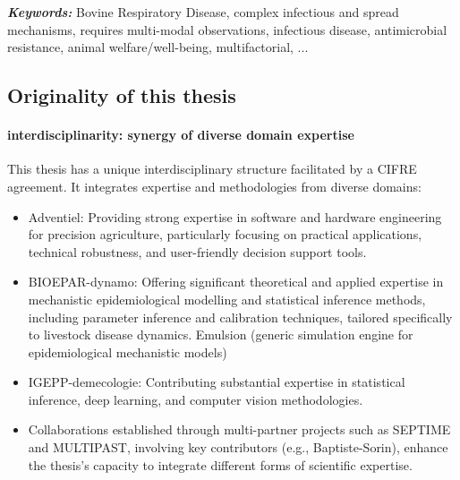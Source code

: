 \textit{\textbf{Keywords:}} Bovine Respiratory Disease, complex infectious and spread mechanisms, requires multi-modal observations, infectious disease, antimicrobial resistance, animal welfare/well-being, multifactorial, ...


\subsection{Originality of this thesis}


\paragraph{interdisciplinarity: synergy of diverse domain expertise }

This thesis has a unique interdisciplinary structure facilitated by a CIFRE agreement. It integrates expertise and methodologies from diverse domains:

\begin{itemize}
    \item Adventiel: Providing strong expertise in software and hardware engineering for precision agriculture, particularly focusing on practical applications, technical robustness, and user-friendly decision support tools.
    \item BIOEPAR-dynamo: Offering significant theoretical and applied expertise in mechanistic epidemiological modelling and statistical inference methods, including parameter inference and calibration techniques, tailored specifically to livestock disease dynamics. Emulsion (generic simulation engine for epidemiological mechanistic models)
    \item IGEPP-demecologie: Contributing substantial expertise in statistical inference, deep learning, and computer vision methodologies.
    \item Collaborations established through multi-partner projects such as SEPTIME and MULTIPAST, involving key contributors (e.g., Baptiste-Sorin), enhance the thesis’s capacity to integrate different forms of scientific expertise.
\end{itemize}

